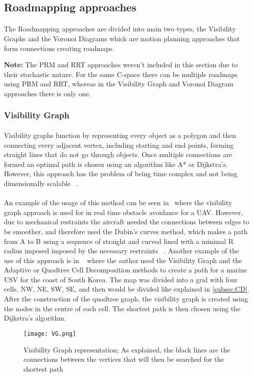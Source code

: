 \subsection{Roadmapping approaches}
\label{subsec:RA}
\paragraph{}The Roadmapping approaches are divided into main two types, the Visibility Graphs and the Voronoi Diagrams which are motion planning approaches
that form connections creating roadmaps. 

\textbf{Note:} The \gls{PRM} and \gls{RRT} approaches weren't included in this section due to their stochastic nature. For the same C-space there
can be multiple roadmaps using PRM and \gls{RRT}, whereas in the Visibility Graph and Voronoi Diagram approaches there is only one.
\subsubsection{Visibility Graph}
\label{subsubsec:VG}
\paragraph{}Visibility graphs function by
representing every object as a polygon and then connecting every adjacent vertex, including starting and end points, 
forming straight lines that do not go through objects. Once multiple connections are formed an optimal path is chosen using an algorithm like A* or 
Dijkstra's. However, this approach has the problem of being time complex and not being dimensionally scalable ~\cite{sym10100450}. 
\paragraph{}An example of the usage of this method can be seen in~\cite{app10165613} where the visibility graph approach is used for in real time
obstacle avoidance for a \gls{UAV}. However, due to mechanical restraints the aircraft needed the connections between edges to be smoother, and therefore
used the Dubin's curves method, which makes a path from A to B using a sequence of straight and curved lined with a minimal R radius imposed
imposed by the necessary restraints ~\cite{aac5c909-7434-3d95-961b-caf3aec6a743}.
Another example of the use of this approach is in ~\cite{LEE2021102887} where the author used the Visibility Graph and the Adaptive or Quadtree Cell Decomposition
methods  to create a path for a marine USV for the coast of South Korea. The map was divided into a grid with four cells, NW, NE, SW, SE, and then would
be divided like explained in \ref{subsec:CD}. After the construction of the quadtree graph, the visibility graph is created using
the nodes in the centre of each cell. The shortest path is then chosen using the Dijkstra's algorithm.
\begin{figure}[h]
    \centering
    \texttt{[image: VG.png]}
    \caption{Visibility Graph representation; As explained, the black lines are the connections between the vertices that will then be searched for the shortest path}
    \label{fig:VG}
\end{figure}
